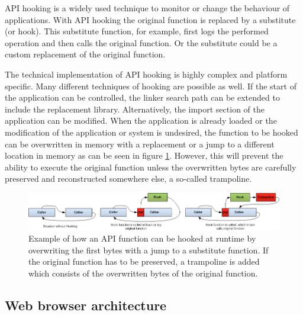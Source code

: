 API hooking is a widely used technique to monitor or change the behaviour of applications. With API hooking the original function is replaced by a substitute (or hook). This substitute function, for example, first logs the performed operation and then calls the original function. Or the substitute could be a custom replacement of the original function.

The technical implementation of API hooking is highly complex and platform specific. Many different techniques \cite{jbremer2012} of hooking are possible as well. If the start of the application can be controlled, the linker search path can be extended to include the replacement library. Alternatively, the import section of the application can be modified. When the application is already loaded or the modification of the application or system is undesired, the function to be hooked can be overwritten in memory with a replacement or a jump to a different location in memory as can be seen in figure \ref{fig:apihooking}. However, this will prevent the ability to execute the original function unless the overwritten bytes are carefully preserved and reconstructed somewhere else, a so-called trampoline.

\begin{figure}
    \centering
    \includegraphics[width=14.7cm]{Images/API-hooking.png}
    \caption{Example of how an API function can be hooked at runtime by overwriting the first bytes with a jump to a substitute function. If the original function has to be preserved, a trampoline is added which consists of the overwritten bytes of the original function. \cite{APIHookImage}}
    \label{fig:apihooking}
\end{figure}

\vspace{-2mm}





\subsection{Web browser architecture}

